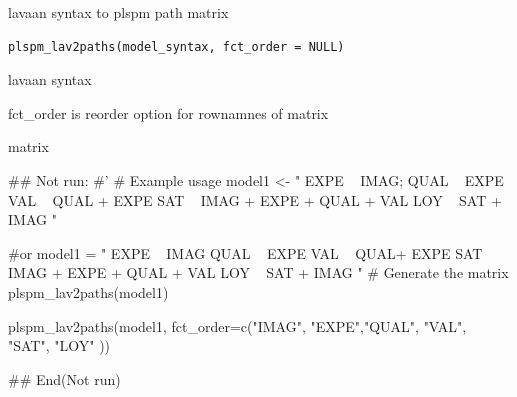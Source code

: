 \documentclass[a4paper]{book}
\begin{document}
%
\begin{Description}
lavaan syntax to plspm path matrix
\end{Description}
%
\begin{Usage}
\begin{verbatim}
plspm_lav2paths(model_syntax, fct_order = NULL)
\end{verbatim}
\end{Usage}
%
\begin{Arguments}
\begin{ldescription}
\item[\code{model\_syntax}] lavaan syntax

\item[\code{fct\_order}] fct\_order is reorder option for rownamnes of matrix
\end{ldescription}
\end{Arguments}
%
\begin{Value}
matrix
\end{Value}
%
\begin{Examples}
\begin{ExampleCode}
\#\# Not run: 
#'
# Example usage
model1 <- "
EXPE ~ IMAG; QUAL ~ EXPE
VAL ~ QUAL + EXPE
SAT ~ IMAG + EXPE + QUAL + VAL
LOY ~ SAT + IMAG
"

 #or
model1 = "
EXPE ~ IMAG
QUAL ~ EXPE
VAL ~  QUAL+ EXPE
SAT ~ IMAG + EXPE + QUAL + VAL
LOY ~ SAT + IMAG
"
# Generate the matrix
plspm_lav2paths(model1)

plspm_lav2paths(model1, fct_order=c("IMAG", "EXPE","QUAL", "VAL", "SAT", "LOY" ))



## End(Not run)

\end{ExampleCode}
\end{Examples}
\end{document}
